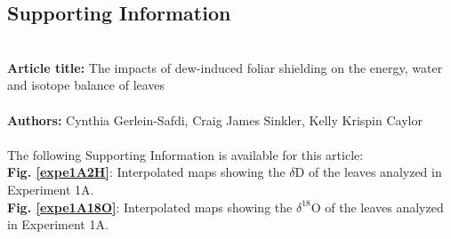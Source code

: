 \documentclass[twoside]{article}
\begin{document}
\subsection*{Supporting Information}
~\\
\textbf{Article title:} The impacts of dew-induced foliar shielding on the energy, water and isotope balance of leaves\\
~\\
\textbf{Authors:} Cynthia Gerlein-Safdi, Craig James Sinkler, Kelly Krispin Caylor\\
~\\
The following Supporting Information is available for this article:\\
\textbf{Fig. \ref{expe1A2H}}: Interpolated maps showing the $\delta$D of the leaves analyzed in Experiment 1A.\\
\textbf{Fig. \ref{expe1A18O}}: Interpolated maps showing the $\delta^{\text{18}}$O of the leaves analyzed in Experiment 1A.\\

\setcounter{equation}{0}
\setcounter{figure}{0}
\setcounter{table}{0}
\setcounter{page}{1}
\renewcommand{\theequation}{S\arabic{equation}}
\renewcommand{\thefigure}{S\arabic{figure}}
\end{document}
